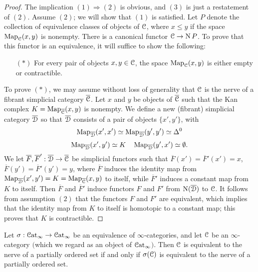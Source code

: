 \begin{proof}
The implication $(1) \Rightarrow (2)$ is obvious, and $(3)$ is just a restatement of $(2)$.
Assume $(2)$; we will show that $(1)$ is satisfied. Let $P$ denote the collection of equivalence
classes of objects of $\operatorname{\mathcal{C}}$, where $x \leq y$ if the space $\operatorname{{Map}}_{\operatorname{\mathcal{C}}}(x,y)$ is nonempty. 
There is a canonical functor $\operatorname{\mathcal{C}} \rightarrow \operatorname{N} P$. To prove that this functor is an equivalence, it will suffice to show the following:
\begin{itemize}
\item[$(\ast)$] For every pair of objects $x,y \in \operatorname{\mathcal{C}}$, the space $\operatorname{{Map}}_{\operatorname{\mathcal{C}}}(x,y)$ is either empty or contractible.
\end{itemize}
To prove $(\ast)$, we may assume without loss of generality that $\operatorname{\mathcal{C}}$ is the nerve of a fibrant
simplicial category $\overline{\operatorname{\mathcal{C}}}$. Let $x$ and $y$ be objects of $\overline{\operatorname{\mathcal{C}}}$ such that
the Kan complex $K = \operatorname{{Map}}_{ \overline{\operatorname{\mathcal{C}}} }(x,y)$ is nonempty.
We define a new (fibrant) simplicial category $\overline{\operatorname{\mathcal{D}}}$ so that $\overline{\operatorname{\mathcal{D}}}$ consists of a pair of objects $\{x', y'\}$, with
$$ \operatorname{{Map}}_{\overline{\operatorname{\mathcal{D}}}}(x',x') \simeq \operatorname{{Map}}_{\overline{\operatorname{\mathcal{D}}}}(y',y') \simeq \Delta^0$$
$$ \operatorname{{Map}}_{\overline{\operatorname{\mathcal{D}}}}(x',y') \simeq K \quad \operatorname{{Map}}_{\overline{\operatorname{\mathcal{D}}}}(y',x') \simeq \emptyset.$$
We let $\overline{F}, \overline{F}': \overline{\operatorname{\mathcal{D}}} \rightarrow \overline{\operatorname{\mathcal{C}}}$ be simplicial functors
such that $\overline{F}(x') = \overline{F}'(x') = x$, $\overline{F}(y') = \overline{F}'(y')=y$, where
$\overline{F}$ induces the identity map from $\operatorname{{Map}}_{\overline{\operatorname{\mathcal{D}}}}(x',y') = K = \operatorname{{Map}}_{\overline{\operatorname{\mathcal{C}}}}(x,y)$ to itself, while $\overline{F}'$ induces a constant map from $K$ to itself.
Then $\overline{F}$ and $\overline{F}'$ induce functors $F$ and $F'$ from $\operatorname{N}( \overline{\operatorname{\mathcal{D}}} )$ to $\operatorname{\mathcal{C}}$. It follows from assumption $(2)$ that the functors $F$ and $F'$ are equivalent, which implies that the identity map from $K$ to itself is homotopic to a constant map; this proves that $K$ is contractible. 
\end{proof}

\begin{corollary}\label{bigegg}
Let $\sigma: \operatorname{\mathcal{C}at}_{\infty} \rightarrow \operatorname{\mathcal{C}at}_{\infty}$ be an equivalence of $\infty$-categories, and let
$\operatorname{\mathcal{C}}$ be an $\infty$-category $($which we regard as an object of $\operatorname{\mathcal{C}at}_{\infty}${}$)$. Then $\operatorname{\mathcal{C}}$ is equivalent to the nerve of a partially ordered set if and only if $\sigma(\operatorname{\mathcal{C}})$ is equivalent to the nerve of a partially ordered set.
\end{corollary}

